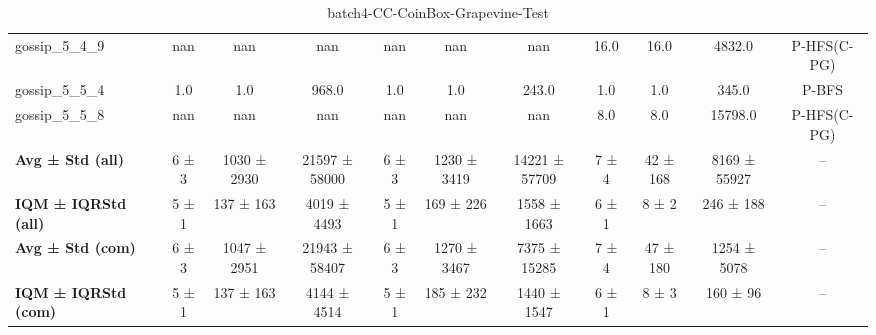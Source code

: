 \begin{table}[!ht]
\begin{tabular}{l|ccc|ccc|cccc}
gossip\_5\_4\_9 & nan & nan & nan & nan & nan & nan & 16.0 & 16.0 & 4832.0 & P-HFS(C-PG) \\
gossip\_5\_5\_4 & 1.0 & 1.0 & 968.0 & 1.0 & 1.0 & 243.0 & 1.0 & 1.0 & 345.0 & P-BFS \\
gossip\_5\_5\_8 & nan & nan & nan & nan & nan & nan & 8.0 & 8.0 & 15798.0 & P-HFS(C-PG) \\
\hline
\textbf{Avg ± Std (all)} & 6 ± 3 & 1030 ± 2930 & 21597 ± 58000 & 6 ± 3 & 1230 ± 3419 & 14221 ± 57709 & 7 ± 4 & 42 ± 168 & 8169 ± 55927 & -- \\
\textbf{IQM ± IQRStd (all)} & 5 ± 1 & 137 ± 163 & 4019 ± 4493 & 5 ± 1 & 169 ± 226 & 1558 ± 1663 & 6 ± 1 & 8 ± 2 & 246 ± 188 & -- \\
\textbf{Avg ± Std (com)} & 6 ± 3 & 1047 ± 2951 & 21943 ± 58407 & 6 ± 3 & 1270 ± 3467 & 7375 ± 15285 & 7 ± 4 & 47 ± 180 & 1254 ± 5078 & -- \\
\textbf{IQM ± IQRStd (com)} & 5 ± 1 & 137 ± 163 & 4144 ± 4514 & 5 ± 1 & 185 ± 232 & 1440 ± 1547 & 6 ± 1 & 8 ± 3 & 160 ± 96 & -- \\
\end{tabular}
\caption{batch4-CC-CoinBox-Grapevine-Test}
\label{tab:batch4_CC-CoinBox-Grapevine_comparison_test}
\end{table}

